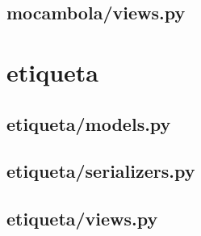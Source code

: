 \subsection{mocambola/views.py}




\section{etiqueta}

\subsection{etiqueta/models.py}


\subsection{etiqueta/serializers.py}


\subsection{etiqueta/views.py}


%

%



